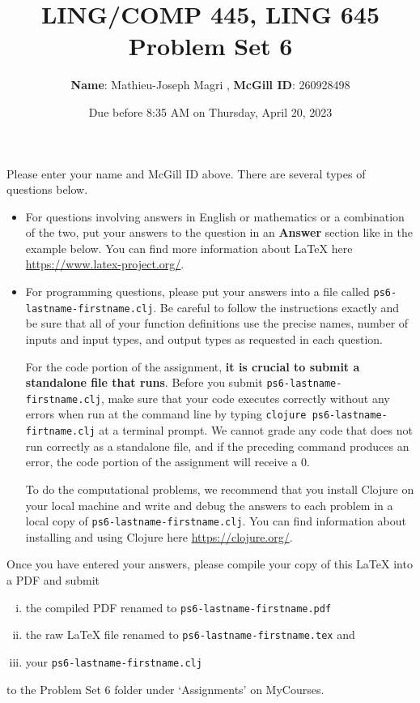 \documentclass[10pt]{article}
\author{ 
  \textbf{Name}: Mathieu-Joseph Magri      %
, \textbf{McGill ID}: 260928498 %
}
\newcommand{\PSnum}{6}
\begin{document}
\title{LING/COMP 445, LING 645\\Problem Set \PSnum}
\date{Due before 8:35 AM on Thursday, April 20, 2023}
\maketitle
Please enter your name and McGill ID above.
There are several types of questions below. 
\begin{itemize}
\item
For questions involving answers in English or mathematics or a
combination of the two, put your answers to the question in an
\textbf{Answer} section like in the example below. You can find more
information about \LaTeX{} here \url{https://www.latex-project.org/}.

\item For programming questions,
please put your answers into a file called
\texttt{ps\PSnum-lastname-firstname.clj}. Be careful to follow the instructions
exactly and be sure that all of your function definitions use the
precise names, number of inputs and input types, and output types as
requested in each question.

For the code portion of the assignment, \textbf{it is crucial to submit a
standalone file that runs}. Before you submit \texttt{ps\PSnum-lastname-firstname.clj}, 
make sure that your code executes correctly without any errors 
when run at the command line by typing 
\texttt{clojure ps\PSnum-lastname-firtname.clj} at a terminal
prompt. We cannot grade any code that does not run correctly as a
standalone file, and if the preceding command produces an error,
the code portion of the assignment will receive a $0$.

To do the computational problems, we recommend that you install
Clojure on your local machine and write and debug the answers to each
problem in a local copy of \texttt{ps\PSnum-lastname-firstname.clj}. You can
find information about installing and using Clojure here
\url{https://clojure.org/}.
\end{itemize}
Once you have entered your answers, please compile your copy of this
\LaTeX{} into a PDF and submit 
\begin{enumerate}[(i),noitemsep]
\item
the compiled PDF renamed to
\texttt{ps\PSnum-lastname-firstname.pdf} 
\item
the raw \LaTeX{} file renamed to
\texttt{ps\PSnum-lastname-firstname.tex} and 
\item
your \texttt{ps\PSnum-lastname-firstname.clj}
\end{enumerate}
to the Problem Set \PSnum{} folder under `Assignments' on MyCourses.
\end{document}
